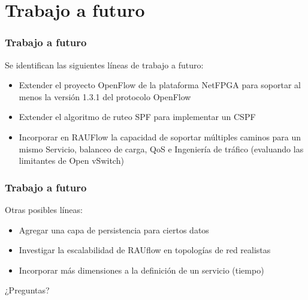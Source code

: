 \documentclass{beamer}
\begin{document}


\section{Trabajo a futuro} 
\frame{\tableofcontents[currentsection]}

\begin{frame}
\frametitle{Trabajo a futuro} 

Se identifican las siguientes l\'ineas de trabajo a futuro:
\pause

\begin{itemize}[<+->]

\item Extender el proyecto OpenFlow de la plataforma NetFPGA para soportar al menos la versi\'on 1.3.1 del protocolo OpenFlow

\item Extender el algoritmo de ruteo SPF para implementar un CSPF

\item Incorporar en RAUFlow la capacidad de soportar m\'ultiples caminos para un mismo Servicio,  balanceo de carga, QoS e Ingenier\'ia de tr\'afico (evaluando las limitantes de Open vSwitch)

\end{itemize}

\end{frame}

\begin{frame}
\frametitle{Trabajo a futuro} 

Otras posibles l\'ineas:
\pause
\begin{itemize}[<+->]

\item Agregar una capa de persistencia para ciertos datos

\item Investigar la escalabilidad de RAUflow en topolog\'ias de red realistas 


\item Incorporar m\'as dimensiones a la definici\'on de un servicio (tiempo)

\end{itemize}

\end{frame}

\begin{frame}
\centering
\Huge
¿Preguntas?

\end{frame}


\end{document}
